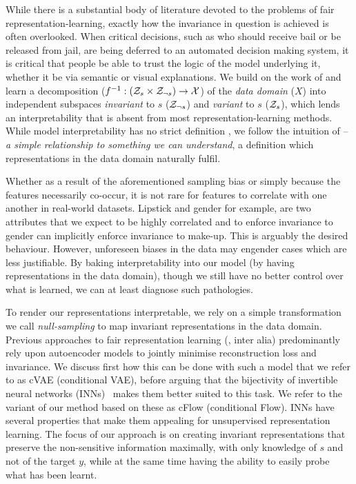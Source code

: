 While there is a substantial body of literature devoted to the problems of fair
representation-learning, exactly how the invariance in question is achieved is often overlooked.
%
When critical decisions, such as who should receive bail or be released from jail, are being
deferred to an automated decision making system, it is critical that people be able to trust the
logic of the model underlying it, whether it be via semantic or visual explanations. 
%
We build on the work of \citet{QuaShaTho19} and learn a decomposition ($f^{-1}: ({\mathcal{Z}}_s \times
{\mathcal{Z}}_{\neg s}) \to {\mathcal{X}}$) of the \emph{data domain} ($X$) into independent subspaces
\emph{invariant} to  $s$ (${\mathcal{Z}}_{\neg s}$) and \emph{variant} to $s$ (${\mathcal{Z}}_{s}$), which lends an
interpretability that is absent from most representation-learning methods. 
%
While model interpretability has no strict definition \citep{zhang2018visual}, we follow the
intuition of \citet{adel2018discovering} -- \emph{a simple relationship to something we can
understand}, a definition which representations in the data domain naturally fulfil.

Whether as a result of the aforementioned sampling bias or simply because the features necessarily
co-occur, it is not rare for features to correlate with one another in real-world datasets.
%
Lipstick and gender for example, are two attributes that we expect to be highly correlated and to
enforce invariance to gender can implicitly enforce invariance to make-up. 
%
This is arguably the desired behaviour. 
%
However, unforeseen biases in the data may engender cases which are less justifiable. 
%
By baking interpretability into our model (by having representations in the data domain), though we
still have no better control over what is learned, we can at least diagnose such pathologies.

To render our representations interpretable, we rely on a simple transformation we call
\emph{null-sampling} to map invariant representations in the data domain. 
%
Previous approaches to fair representation learning
(\cite{beutel2017data,edwards2016censoring,madras2018learning,louizos2016variational}, inter alia)
predominantly rely upon autoencoder models to jointly minimise reconstruction loss and invariance. 
%
We discuss first how this can be done with such a model that we refer to as cVAE (conditional VAE),
before arguing that the bijectivity of invertible neural networks (INNs)~\citep{Dinh2014} makes
them better suited to this task. 
%
We refer to the variant of our method based on these as cFlow (conditional Flow). 
%
INNs have several properties that make them appealing for unsupervised representation learning. 
%
The focus of our approach is on creating invariant representations that preserve the non-sensitive
information maximally, with only knowledge of $s$ and not of the target $y$, while at the same time
having the ability to easily probe what has been learnt.

